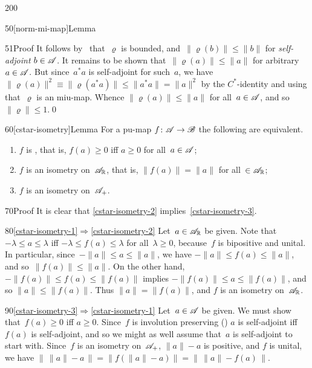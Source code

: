 \begin{parsec}{200}
\begin{point}{50}[norm-mi-map]{Lemma}
\begin{point}{51}{Proof}
It follows by~
that~$\varrho$ is bounded, and~$\|\varrho(b)\|\leq \|b\|$
for \emph{self-adjoint} $b\in \mathscr{A}$.
It remains to be shown that~$\|\varrho(a)\|\leq \|a\|$
for arbitrary~$a\in\mathscr{A}$.
But since~$a^*a$ is self-adjoint for such~$a$,
we have $\|\varrho(a)\|^2\equiv\|\varrho(a^*a)\|\leq \|a^*a\|=\|a\|^2$
by the $C^*$-identity and using that~$\varrho$
    is an miu-map. Whence $\|\varrho(a)\|\leq\|a\|$
    for all~$a\in\mathscr{A}$, and so~$\|\varrho\|\leq 1$.\qed
\end{point}
\end{point}
\begin{point}{60}[cstar-isometry]{Lemma}%
For a pu-map $f\colon \mathscr{A}\to\mathscr{B}$
the following are equivalent.
\begin{enumerate}
\item\label{cstar-isometry-1}
$f$ is %
%
, that is, $f(a)\geq 0$ iff $a\geq 0$
for all~$a\in\mathscr{A}$;
\item\label{cstar-isometry-2}%
$f$ is an isometry on~$\mathscr{A}_{\mathbb{R}}$, 
that is, $\|f(a)\|=\|a\|$ for all~$\in \mathscr{A}_{\mathbb{R}}$;
\item\label{cstar-isometry-3}
	$f$ is an isometry on~$\mathscr{A}_{+}$.
\end{enumerate}%
\spacingfix{}%
\begin{point}{70}{Proof}%
It is clear that \ref{cstar-isometry-2} implies~\ref{cstar-isometry-3}.
\begin{point}{80}{\ref{cstar-isometry-1}$\Longrightarrow$\ref{cstar-isometry-2}}%
Let~$a\in \mathscr{A}_{\mathbb{R}}$ be given.
Note that $-\lambda \leq a\leq \lambda$
iff $-\lambda \leq f(a) \leq \lambda$
for all~$\lambda \geq 0$,
because~$f$ is bipositive and unital.
In particular,
since~$-\|a\|\leq a\leq \|a\|$,
we have $-\|a\|\leq f(a)\leq \|a\|$,
and so~$\|f(a)\|\leq \|a\|$.
On the other hand,
$-\|f(a)\|\leq f(a)\leq \|f(a)\|$
implies $-\|f(a)\|\leq a\leq \|f(a)\|$,
and so $\|a\|\leq \|f(a)\|$.
Thus $\|a\|=\|f(a)\|$,
and $f$ is an isometry on~$\mathscr{A}_{\mathbb{R}}$.
\end{point}
\begin{point}{90}{\ref{cstar-isometry-3}$\Longrightarrow$\ref{cstar-isometry-1}}%
Let~$a\in \mathscr{A}$ be given.
We must show that~$f(a)\geq 0$ iff $a\geq 0$.
Since~$f$ is involution preserving ()
$a$ is self-adjoint iff $f(a)$ is self-adjoint,
and so we might as well assume that~$a$ is self-adjoint
to start with.
Since~$f$ is an isometry on~$\mathscr{A}_+$,
$\|a\|-a$ is positive,
and $f$ is unital,
we have $\|\,\|a\|-a\,\|=\|f(\|a\|-a)\|=\|\,\|a\|-f(a)\,\|$.

\end{point}
\end{point}
\end{point}
\end{parsec}
